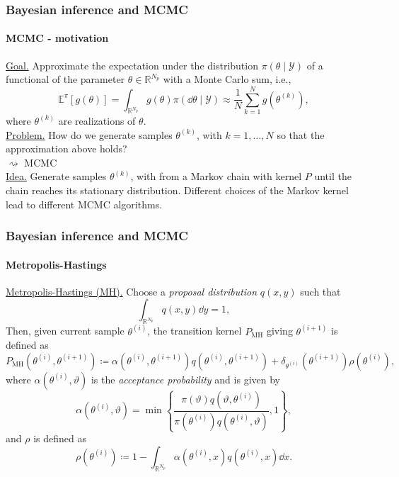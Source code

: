 \documentclass{beamer}
\newcommand{\R}{\mathbb{R}}
\newcommand{\E}{\mathbb{E}}
\newcommand{\defeq}{\coloneqq}
\begin{document}
\begin{frame}
	\frametitle{Bayesian inference and MCMC}
	\framesubtitle{MCMC - motivation}
	
	\underline{Goal.} Approximate the expectation under the distribution $\pi(\theta \mid \mathcal{Y})$ of a functional of the parameter $\theta \in \R^{N_p}$ with a Monte Carlo sum, i.e.,
	\begin{equation*}\label{eq:MonteCarlo}
			 \E^\pi\left[g(\theta)\right] = \int_{\R^{N_p}} g(\theta)\pi(\dd\theta\mid\mathcal{Y})  \approx \frac{1}{N}\sum_{k = 1}^{N} g(\theta^{(k)}),
	\end{equation*}
	where $\theta^{(k)}$ are realizations of $\theta$. \\[0.5cm]
	\underline{Problem.} How do we generate samples $\theta^{(k)}$, with $k = 1, \ldots, N$ so that the approximation above holds? \\
	$\rightsquigarrow$ MCMC \cite[e.g.]{Gil05} \\[0.5cm]
	\underline{Idea.} Generate samples $\theta^{(k)}$, with from a Markov chain with kernel $P$ until the chain reaches its stationary distribution. Different choices of the Markov kernel lead to different MCMC algorithms.	
\end{frame}

\begin{frame}
	\frametitle{Bayesian inference and MCMC}
	\framesubtitle{Metropolis-Hastings}		
	
	\underline{Metropolis-Hastings (MH).} Choose a \textit{proposal distribution} $q(x,y)$ such that
	\begin{equation*}
		\int_{\R^{N_p}}q(x, y)\dd y = 1,
	\end{equation*}
	Then, given current sample $\theta^{(i)}$, the transition kernel $P_{\mathrm{MH}}$ giving $\theta^{(i+1)}$ is defined as
	\begin{equation*}
		P_{\mathrm{MH}}(\theta^{(i)}, \theta^{(i+1)}) \defeq \alpha(\theta^{(i)}, \theta^{(i+1)})q(\theta^{(i)},\theta^{(i+1)}) + \delta_{\theta^{(i)}}(\theta^{(i+1)})\rho(\theta^{(i)}),
	\end{equation*}
	where $\alpha(\theta^{(i)}, \vartheta)$ is the \textit{acceptance probability} and is given by
	\begin{equation*}\label{eq:MHalpha}
		\alpha(\theta^{(i)}, \vartheta) = \min\left\{\frac{\pi(\vartheta)q(\vartheta, \theta^{(i)})}{\pi(\theta^{(i)})q(\theta^{(i)}, \vartheta)}, 1\right\},
	\end{equation*}
	and $\rho$ is defined as
	\begin{equation*}
	 	\rho(\theta^{(i)}) \defeq 1 - \int_{\R^{N_p}}\alpha(\theta^{(i)}, x)q(\theta^{(i)}, x)\dd x.
	\end{equation*}
\end{frame}
\end{document}
